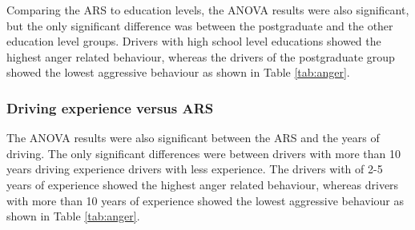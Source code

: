 \documentclass[preprint,12pt,a4paper,authoryear]{elsarticle}
\begin{document}
Comparing the ARS to education levels, the ANOVA results were also significant, but the only significant difference was between the postgraduate and the other education level groups. Drivers with high school level educations showed the highest anger related behaviour, whereas the drivers of the postgraduate group showed the lowest aggressive behaviour as shown in Table \ref{tab:anger}.

\subsubsection{Driving experience versus ARS}
The ANOVA results were also significant between the ARS and the years of driving. The only significant differences were between drivers with more than 10 years driving experience drivers with less experience. The drivers with of 2-5 years of experience showed the highest anger related behaviour, whereas drivers with more than 10 years of experience showed the lowest aggressive behaviour as shown in Table \ref{tab:anger}.
\end{document}
